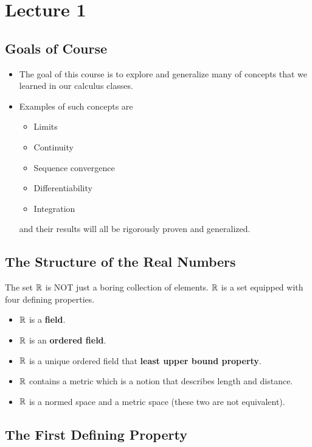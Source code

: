 \documentclass[a4paper]{report}
\begin{document}
\section{Lecture 1}

\subsection{Goals of Course}
\begin{itemize}
    \item The goal of this course is to explore and generalize many of concepts that we learned in our calculus classes. 
    \item Examples of such concepts are
        \begin{itemize}
            \item Limits 
            \item Continuity
            \item Sequence convergence 
            \item Differentiability
            \item Integration
        \end{itemize}
        and their results will all be rigorously proven and generalized. 
\end{itemize}

\subsection{The Structure of the Real Numbers}


The set \( \mathbb{R}  \) is NOT just a boring collection of elements. \( \mathbb{R}  \) is a set equipped with four defining properties.

\begin{itemize}
    \item \( \mathbb{R}  \) is a \textbf{field}.
    \item \( \mathbb{R}  \) is an \textbf{ordered field}. 
    \item \( \mathbb{R}  \) is a unique ordered field that \textbf{least upper bound property}.
    \item \( \mathbb{R}  \) contains a metric which is a notion that describes length and distance. 
    \item \( \mathbb{R}  \) is a normed space and a metric space (these two are not equivalent).
\end{itemize}


\subsection{The First Defining Property}
\end{document}
